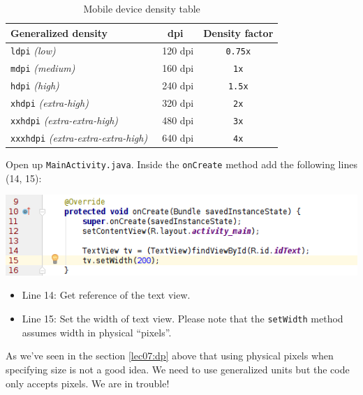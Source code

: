 \begin{table}
	\begin{center}
		\begin{tabular}{|l|c|c|}
			\hline \textbf{Generalized density}	& \textbf{dpi} & \textbf{Density factor} \\
			\hline
			\hline \texttt{ldpi} \textit{(low)} & ~120 dpi & \texttt{0.75x} \\
			\hline \texttt{mdpi} \textit{(medium)} &  ~160 dpi & \texttt{1x} \\
			\hline \texttt{hdpi} \textit{(high)} & ~240 dpi & \texttt{1.5x} \\
			\hline \texttt{xhdpi} \textit{(extra-high)} & ~320 dpi & \texttt{2x} \\
			\hline \texttt{xxhdpi} \textit{(extra-extra-high)} & ~480 dpi & \texttt{3x} \\
			\hline \texttt{xxxhdpi} \textit{(extra-extra-extra-high)} & ~640 dpi & \texttt{4x} \\
			\hline 
		\end{tabular} 
	\end{center}
	\caption{Mobile device density table}\label{ITS:densityChart}
\end{table}

Open up \texttt{MainActivity.java}. Inside the \texttt{onCreate} method add the following lines (14, 15):

\begin{center}
	\includegraphics[scale=0.4]{chapters/ch06/images/4}
\end{center} 

\begin{itemize}
	\item Line 14: Get reference of the text view.
	\item Line 15: Set the width of text view. Please note that the \texttt{setWidth} method assumes width in physical ``pixels''.
\end{itemize}

As we've seen in the section \ref{lec07:dp} above that using physical pixels when specifying size is not a good idea. We need to use generalized units but the code only accepts pixels. We are in trouble!

